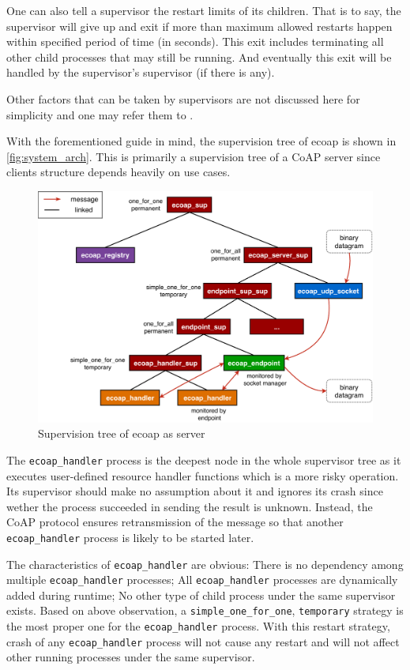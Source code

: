 One can also tell a supervisor the restart limits of its children. That is to say, the supervisor will give up and exit if more than maximum allowed restarts happen within specified period of time (in seconds). This exit includes terminating all other child processes that may still be running. And eventually this exit will be handled by the supervisor's supervisor (if there is any).

Other factors that can be taken by supervisors are not discussed here for simplicity and one may refer them to \autocite{otp_supervisor}.

With the forementioned guide in mind, the supervision tree of ecoap is shown in \autoref{fig:system_arch}. This is primarily a supervision tree of a CoAP server since clients structure depends heavily on use cases. 

\begin{figure}[!htbp]
\centering
\includegraphics[scale = 0.7]{system_arch_vertical}
\caption{Supervision tree of ecoap as server}
\label{fig:system_arch}
\end{figure}

The \verb|ecoap_handler| process is the deepest node in the whole supervisor tree as it executes user-defined resource handler functions which is a more risky operation. Its supervisor should make no assumption about it and ignores its crash since wether the process succeeded in sending the result is unknown. Instead, the CoAP protocol ensures retransmission of the message so that another \verb|ecoap_handler| process is likely to be started later. 

The characteristics of \verb|ecoap_handler| are obvious: There is no dependency among multiple \verb|ecoap_handler| processes; All \verb|ecoap_handler| processes are dynamically added during runtime; No other type of child process under the same supervisor exists. Based on above observation, a \verb|simple_one_for_one|, \verb|temporary| strategy is the most proper one for the \verb|ecoap_handler| process. With this restart strategy, crash of any \verb|ecoap_handler| process will not cause any restart and will not affect other running processes under the same supervisor.

